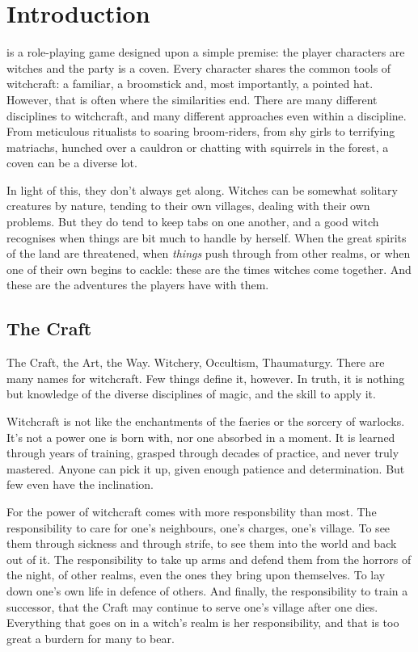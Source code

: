 \chapter{Introduction}

 is a role-playing game designed upon a simple premise: the player characters are witches and the party is a coven.
Every character shares the common tools of witchcraft: a familiar, a broomstick and, most importantly, a pointed hat.
However, that is often where the similarities end.
There are many different disciplines to witchcraft, and many different approaches even within a discipline.
From meticulous ritualists to soaring broom-riders, from shy girls to terrifying matriachs, hunched over a cauldron or chatting with squirrels in the forest, a coven can be a diverse lot.

In light of this, they don't always get along.
Witches can be somewhat solitary creatures by nature, tending to their own villages, dealing with their own problems.
But they do tend to keep tabs on one another, and a good witch recognises when things are bit much to handle by herself.
When the great spirits of the land are threatened, when \emph{things} push through from other realms, or when one of their own begins to cackle: these are the times witches come together.
And these are the adventures the players have with them.

\section{The Craft}

The Craft, the Art, the Way.
Witchery, Occultism, Thaumaturgy.
There are many names for witchcraft.
Few things define it, however.
In truth, it is nothing but knowledge of the diverse disciplines of magic, and the skill to apply it.

Witchcraft is not like the enchantments of the faeries or the sorcery of warlocks.
It's not a power one is born with, nor one absorbed in a moment.
It is learned through years of training, grasped through decades of practice, and never truly mastered.
Anyone can pick it up, given enough patience and determination.
But few even have the inclination.

For the power of witchcraft comes with more responsbility than most.
The responsibility to care for one's neighbours, one's charges, one's village.
To see them through sickness and through strife, to see them into the world and back out of it.
The responsibility to take up arms and defend them from the horrors of the night, of other realms, even the ones they bring upon themselves.
To lay down one's own life in defence of others.
And finally, the responsibility to train a successor, that the Craft may continue to serve one's village after one dies.
Everything that goes on in a witch's realm is her responsibility, and that is too great a burdern for many to bear.

